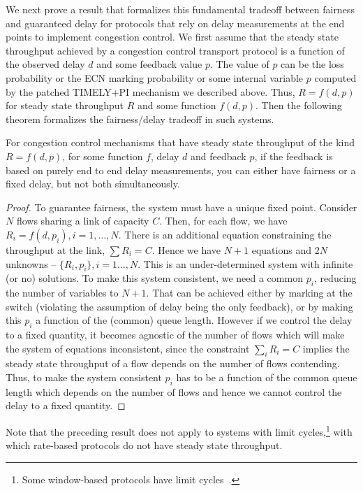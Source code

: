 We next prove a result that formalizes this fundamental tradeoff between fairness
and guaranteed delay for protocols that rely on delay measurements at the end
points to implement congestion control. We first assume that the
steady state throughput achieved by a congestion control transport
protocol is a function of the observed delay $d$ and some feedback
value $p$. The value of $p$ can be the loss probability or the ECN marking
probability or some internal variable $p$ computed by the patched
TIMELY+PI mechanism we described above. Thus,
$R = f(d,p)$ for steady state throughput $R$ and some function $f(d,p)$. Then the
following theorem formalizes the fairness/delay tradeoff in such systems.

\begin{thm}
\label{thm:fairness-delay}
For congestion control mechanisms that have steady state throughput of
the kind $R = f(d,p)$, for some function $f$, delay $d$ and
feedback $p$, if the feedback is based on purely end to end
delay measurements, you can either have fairness or a fixed delay, 
but not both simultaneously.
\end{thm}
\begin{proof}
To guarantee fairness, the system must have a
unique fixed point. 
Consider $N$ flows sharing a link of capacity $C$. 
Then, for each flow, we have 
$ R_i = f(d,p_i), i = 1,\ldots,N.$
There is an additional equation constraining the throughput at the
link, $\sum R_i = C$.
Hence we have $N+1$ equations and $2 N$ unknowns -- $\{R_i,p_i\},
 i=1\ldots,N$. This is an under-determined system with infinite (or no)
solutions. To make this system consistent, we need a common $p_i$,
reducing the number of variables to $N+1$. That can be achieved
either by marking at the switch (violating the assumption of delay
being the only feedback), or by making this $p_i$ a function of
the (common) queue length. However if we control the delay to a fixed quantity,
it becomes agnostic of the number of flows which will make the system
of equations inconsistent, since the constraint $\sum_i R_i = C$
implies the steady state throughput of a flow depends on the number of
flows contending. Thus, to make the system consistent $p_i$ has to be
a function of the common queue length which depends on the number of flows 
and hence we cannot control the delay to a fixed quantity. 
\end{proof}
Note that the preceding result does not apply to systems with
limit cycles,\footnote{Some window-based protocols have limit cycles~\cite{dctcp-analysis}.} 
with which rate-based protocols do not have steady state throughput.

